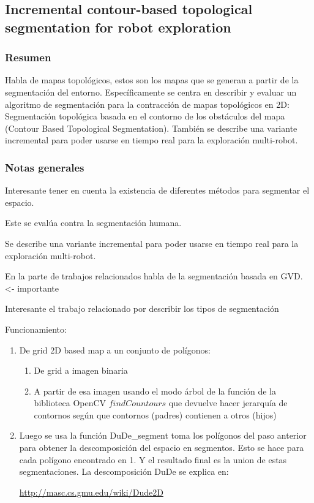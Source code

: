 



\subsection[Incremental contour-based topological segmentation for robot exploration]{Incremental contour-based topological\\ segmentation for robot exploration}
\subsubsection{Resumen}
Habla de mapas topológicos, estos son los mapas que se generan a partir de la segmentación del entorno. 
Específicamente se centra en describir y evaluar un algoritmo de segmentación para la contracción de mapas topológicos en 2D: Segmentación topológica basada en el contorno de los obstáculos del mapa (Contour Based Topological Segmentation).
También se describe una variante incremental para poder usarse en tiempo real para la exploración multi-robot.

\subsubsection{Notas generales}
Interesante tener en cuenta la existencia de diferentes métodos para segmentar el espacio.

Este se evalúa contra la segmentación humana.

Se describe una variante incremental para poder usarse en tiempo real para la exploración multi-robot.

En la parte de trabajos relacionados habla de la segmentación basada en GVD. <- importante

Interesante el trabajo relacionado por describir los tipos de segmentación

Funcionamiento:
\begin{enumerate}
  \item De grid 2D based map a un conjunto de polígonos:
  \begin{enumerate}
     \item De grid a imagen binaria
     \item A partir de esa imagen usando el modo árbol de la función de la biblioteca OpenCV $findCountours$ que devuelve hacer jerarquía de contornos según que contornos (padres) contienen a otros (hijos)
  \end{enumerate}
\item Luego se usa la función DuDe\_segment toma los polígonos del paso anterior para obtener la descomposición del espacio en segmentos. Esto se hace para cada polígono encontrado en 1. Y el resultado final es la union de estas segmentaciones. La descomposición DuDe se explica en: 

  \url{http://masc.cs.gmu.edu/wiki/Dude2D}
\end{enumerate}

